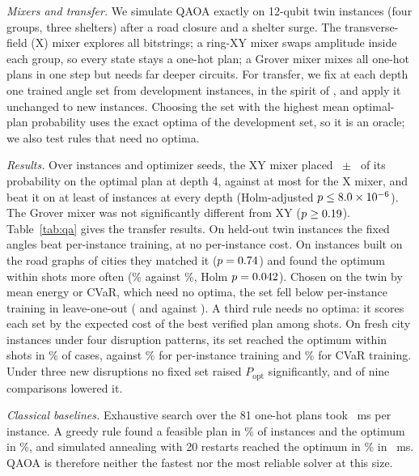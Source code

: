 \documentclass[conference]{IEEEtran}
\begin{document}
\textit{Mixers and transfer.} We simulate QAOA \cite{Farhi2014} exactly on 12-qubit twin instances (four groups, three shelters) after a road closure and a shelter surge. The transverse-field (X) mixer explores all bitstrings; a ring-XY mixer \cite{Hadfield2019,WangZ2020} swaps amplitude inside each group, so every state stays a one-hot plan; a Grover mixer \cite{Bartschi2020} mixes all one-hot plans in one step but needs far deeper circuits. For transfer, we fix at each depth one trained angle set from \QaNPaired{} development instances, in the spirit of \cite{Shaydulin2023}, and apply it unchanged to new instances. Choosing the set with the highest mean optimal-plan probability uses the exact optima of the development set, so it is an oracle; we also test rules that need no optima.

\textit{Results.} Over \QaNPaired{} instances and \QaNSeeds{} optimizer seeds, the XY mixer placed \QaSeedXYMean{}~$\pm$~\QaSeedXYSd{} of its probability on the optimal plan at depth 4, against at most \QaSeedXMax{} for the X mixer, and beat it on at least \QaStXYvXWinsMin{} of \QaNPaired{} instances at every depth (Holm-adjusted $p\le8.0\times10^{-6}$). The Grover mixer was not significantly different from XY ($p\ge0.19$). Table~\ref{tab:qa} gives the transfer results. On \QaHoN{} held-out twin instances the fixed angles beat per-instance training, at no per-instance cost. On \QaCityN{} instances built on the road graphs of \QaCityNCities{} cities they matched it ($p=0.74$) and found the optimum within \QaShots{} shots more often (\QaCitySuccFixed\% against \QaCitySuccTrained\%, Holm $p=0.042$). Chosen on the twin by mean energy or CVaR, which need no optima, the set fell below per-instance training in leave-one-out (\QaSelEnLoo{} and \QaSelCvLoo{} against \QaSelDevTrained). A third rule needs no optima: it scores each set by the expected cost of the best verified plan among \QaShots{} shots. On \QaFrN{} fresh city instances under four disruption patterns, its set reached the optimum within \QaShots{} shots in \QaFrSetSucc\% of cases, against \QaFrTrainedSucc\% for per-instance training and \QaFrCvarSucc\% for CVaR training. Under three new disruptions no fixed set raised $P_{\mathrm{opt}}$ significantly, and \QaDsLosses{} of nine comparisons lowered it.

\textit{Classical baselines.} Exhaustive search over the 81 one-hot plans took \QaExactMs~ms per instance. A greedy rule found a feasible plan in \QaGreedyFeas\% of instances and the optimum in \QaGreedyOpt\%, and simulated annealing with 20 restarts reached the optimum in \QaSATunedOpt\% in \QaSATunedMs~ms. QAOA is therefore neither the fastest nor the most reliable solver at this size.
\end{document}
